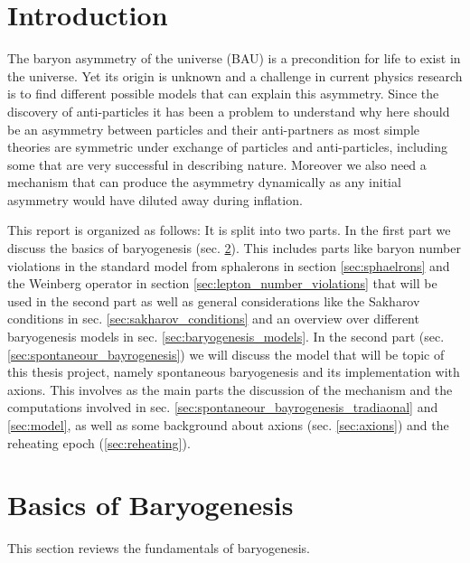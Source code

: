 \documentclass[13pt,a4paper,titlepage]{article}
\begin{document}
\tableofcontents
\newpage

\newcommand{\jana}[1]{{\color{magenta}{#1}}}


\section{Introduction}
\label{sec:introduction}

\noindent
The baryon asymmetry of the universe (BAU) is a precondition for life to exist in the universe.
Yet its origin is unknown and a challenge in current physics research is to find different possible models
that can explain this asymmetry.
Since the discovery of anti-particles it has been a problem to understand why here should be
an asymmetry between particles and their anti-partners as most simple theories are symmetric under
exchange of particles and anti-particles, including some that are
very successful in describing nature. Moreover we also need a mechanism that can
produce the asymmetry dynamically as any initial asymmetry would have diluted away during inflation.

\noindent
This report is organized as follows: It is split into two parts.
In the first part we discuss the basics of baryogenesis (sec. \ref{sec:basics_of_baryogenesis}).
This includes parts like baryon number violations in the standard model from sphalerons in section
\ref{sec:sphaelrons} and the Weinberg operator in section \ref{sec:lepton_number_violations} that will
be used in the second part as well as general considerations like the Sakharov conditions in sec. \ref{sec:sakharov_conditions} and an overview over different baryogenesis models in sec. \ref{sec:baryogenesis_models}.
In the second part (sec. \ref{sec:spontaneour_bayrogenesis}) we will discuss the model that will be topic of this
thesis project, namely spontaneous baryogenesis and its implementation with axions.
This involves as the main parts the discussion of the mechanism and the computations involved in sec. \ref{sec:spontaneour_bayrogenesis_tradiaonal} and \ref{sec:model},
as well as some background about axions (sec. \ref{sec:axions}) and the reheating epoch (\ref{sec:reheating}).

\section{Basics of Baryogenesis}
\label{sec:basics_of_baryogenesis}

This section reviews the fundamentals of baryogenesis.
\end{document}
